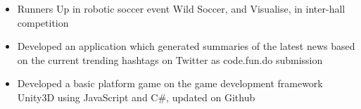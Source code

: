 
\begin{itemize}
  \item Runners Up in robotic soccer event Wild Soccer, and Visualise, in inter-hall competition
  \item Developed an application which generated summaries of the latest news based on the current trending hashtags on Twitter as code.fun.do submission
  \item Developed a basic platform game on the game development framework Unity3D using JavaScript and C\#, updated on Github
    \vspace{-1mm}
\end{itemize}